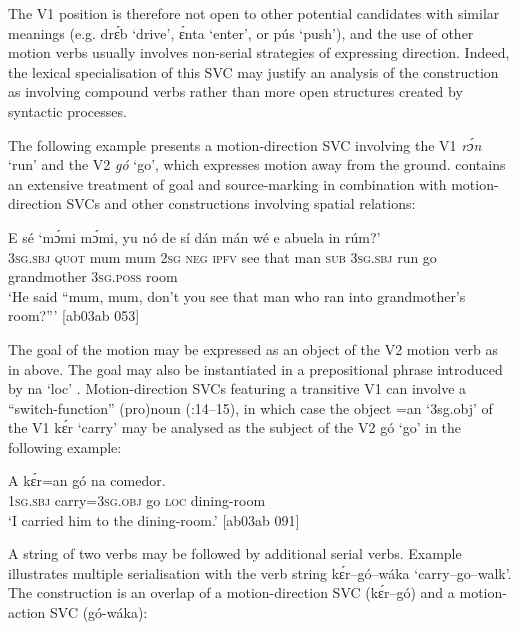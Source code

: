 The V1 position is therefore not open to other potential candidates with similar meanings (e.g. drɛ́b ‘drive’, ɛ́nta ‘enter’, or pús ‘push’), and the use of other motion verbs usually involves non-serial strategies of expressing direction. Indeed, the lexical specialisation of this SVC may justify an analysis of the construction as involving compound verbs {\fff}rather than more open structures created by syntactic processes. 



The following example presents a motion-direction SVC involving the V1 \textit{rɔ́n} ‘run’ and the V2 \textit{gó} ‘go’, which expresses motion away from the ground.  contains an extensive treatment of goal and source-marking in combination with motion-direction SVCs and other constructions involving spatial relations:



\ea%
    \label{ex:key:1543}
    \gll E    sé    ‘mɔ́mi  mɔ́mi,  yu  nó  de  sí  dán  mán    wé  e
      abuela    in    rúm?’\\
\textsc{3sg.sbj}  \textsc{quot}     mum  mum  \textsc{2sg}  \textsc{neg}  \textsc{ipfv}  see  that  man    \textsc{sub}  \textsc{3sg.sbj}
run    go  grandmother  \textsc{3sg.poss}  room\\

\glt ‘He said “mum, mum, don’t you see that man who ran into 
grandmother’s room?”’ [ab03ab 053]
\z

The goal of the motion may be expressed as an object of the V2 motion verb as in  above. The goal may also be instantiated in a prepositional phrase introduced by na ‘loc’ . Motion{\fff}-direction SVCs featuring a transitive V1 can involve a “switch-function{\fff}” (pro)noun (\citealt{Aikhenvald2006}:14–15), in which case the object =an ‘3sg.obj’ of the V1 kɛ́r ‘carry’ may be analysed as the subject{\fff} of the V2 gó ‘go’ in the following example:


\ea%
    \label{ex:key:1544}
    \gll A    kɛ́r=an      gó  na  comedor.\\
\textsc{1sg.sbj}  carry=\textsc{3sg.obj}    go  \textsc{loc}  dining-room\\

\glt ‘I carried him to the dining-room.’ [ab03ab 091]
\z

A string of two verbs may be followed by additional serial verbs. Example  illustrates multiple serialisation{\fff} with the verb string kɛ́r–gó–wáka ‘carry–go–walk’. The construction is an overlap of a motion-direction SVC (kɛ́r–gó) and a motion-action SVC (gó-wáka): 


